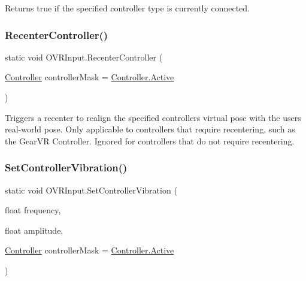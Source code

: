 Returns true if the specified controller type is currently connected. 

\mbox{\label{class_o_v_r_input_ac31fe82f3aab6c0964331831a94833ce}} 
\subsubsection{\texorpdfstring{Recenter\+Controller()}{RecenterController()}}
{\footnotesize\ttfamily static void O\+V\+R\+Input.\+Recenter\+Controller (\begin{DoxyParamCaption}\item[{\mbox{\hyperlink{class_o_v_r_input_a5c86f9052a9cbb0b73779ff5704d60a8}{Controller}}}]{controller\+Mask = {\ttfamily \mbox{\hyperlink{class_o_v_r_input_a5c86f9052a9cbb0b73779ff5704d60a8a4d3d769b812b6faa6b76e1a8abaece2d}{Controller.\+Active}}} }\end{DoxyParamCaption})\hspace{0.3cm}{\ttfamily [static]}}



Triggers a recenter to realign the specified controller\textquotesingle{}s virtual pose with the user\textquotesingle{}s real-\/world pose. Only applicable to controllers that require recentering, such as the Gear\+VR Controller. Ignored for controllers that do not require recentering. 

\mbox{\label{class_o_v_r_input_a53bfdaf8b68f660d37acaabdd79c26e9}} 
\subsubsection{\texorpdfstring{Set\+Controller\+Vibration()}{SetControllerVibration()}}
{\footnotesize\ttfamily static void O\+V\+R\+Input.\+Set\+Controller\+Vibration (\begin{DoxyParamCaption}\item[{float}]{frequency,  }\item[{float}]{amplitude,  }\item[{\mbox{\hyperlink{class_o_v_r_input_a5c86f9052a9cbb0b73779ff5704d60a8}{Controller}}}]{controller\+Mask = {\ttfamily \mbox{\hyperlink{class_o_v_r_input_a5c86f9052a9cbb0b73779ff5704d60a8a4d3d769b812b6faa6b76e1a8abaece2d}{Controller.\+Active}}} }\end{DoxyParamCaption})\hspace{0.3cm}{\ttfamily [static]}}



